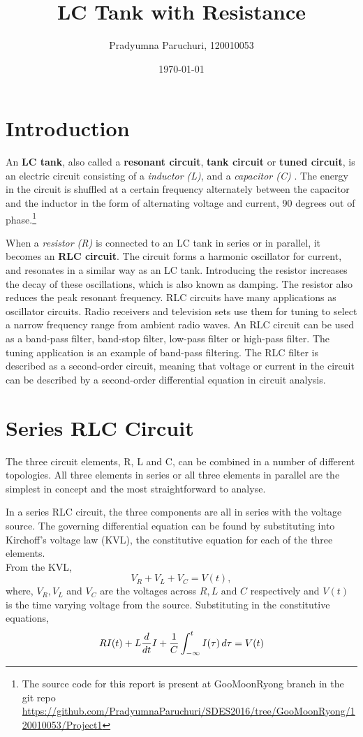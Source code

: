 \documentclass[12pt, twosides]{article}
\title{LC Tank with Resistance}
\date{\today}
\author{Pradyumna Paruchuri, 120010053}
\newcommand{\voltage}{\ensuremath{V}}
\newcommand{\curr}{I}
\newcommand{\res}{R}
\newcommand{\capc}{C}
\newcommand{\ind}{L}
\newcommand{\der}[1]{
\ifnum#1=1
	\frac{d}{dt}
\else
	\frac{d^#1}{dt^#1}
\fi
}
\begin{document}
	\maketitle
	
	\section{Introduction}
		An \textbf{LC tank}, also called a \textbf{resonant circuit}, \textbf{tank circuit} or \textbf{tuned circuit}, is an electric circuit consisting of a \textit{inductor (L)}, and a \textit{capacitor (C)} \cite{Wikipedia}. The energy in the circuit is shuffled at a certain frequency alternately between the capacitor and the inductor in the form of alternating voltage and current, 90 degrees out of phase.\footnote{\label{source} The source code for this report is present at GooMoonRyong branch in the git repo \url{https://github.com/PradyumnaParuchuri/SDES2016/tree/GooMoonRyong/120010053/Project1} }

		When a \textit{resistor (R)} is connected to an LC tank in series or in parallel, it becomes an \textbf{RLC circuit}. The circuit forms a harmonic oscillator for current, and resonates in a similar way as an LC tank. Introducing the resistor increases the decay of these oscillations, which is also known as damping. The resistor also reduces the peak resonant frequency.
		RLC circuits have many applications as oscillator circuits. Radio receivers and television sets use them for tuning to select a narrow frequency range from ambient radio waves. An RLC circuit can be used as a band-pass filter, band-stop filter, low-pass filter or high-pass filter. The tuning application is an example of band-pass filtering. The RLC filter is described as a second-order circuit, meaning that voltage or current in the circuit can be described by a second-order differential equation in circuit analysis.

	\section{Series RLC Circuit}

		The three circuit elements, R, L and C, can be combined in a number of different topologies. All three elements in series or all three elements in parallel are the simplest in concept and the most straightforward to analyse.

		In a series RLC circuit, the three components are all in series with the voltage source. The governing differential equation can be found by substituting into Kirchoff's voltage law (KVL), the constitutive equation for each of the three elements.\\
		From the KVL,
		\[ \voltage_{R} + \voltage_{L} + \voltage_{C} = \voltage(t),\]
		where, \(\voltage_R, \voltage_L\) and \(\voltage_C\) are the voltages across \(\res, \ind \text{ and } \capc\) respectively and \(\voltage(t)\) is the time varying voltage from the source. Substituting in the constitutive equations,
		\begin{equation}
		\label{e:series RLC}
			\res \curr(t) + \ind \der{1} \curr + \frac{1}{\capc} \int_{-\infty}^{t} I(\tau)\, d\tau = \voltage(t)
		\end{equation}
		
\end{document}
